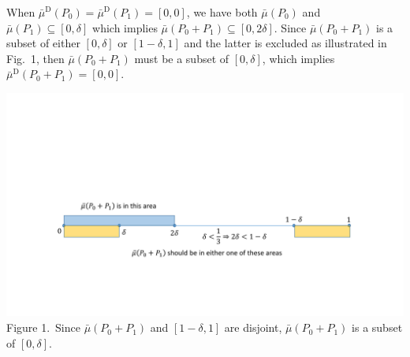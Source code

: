 \documentclass[english,reprint, aps, prl,superscriptaddress, showpacs,
showkeys, longbibliography, amsmath, amssymb, floatfix]{revtex4-1}
\theoremstyle{plain}
\theoremstyle{definition}
\newcommand{\imposs}{\ensuremath{\left[0,0\right]}}
\begin{document}
When $\bar{\mu}^{\textrm{D}}\left(P_{0}\right)=\bar{\mu}^{\textrm{D}}\left(P_{1}\right)=\imposs$,
we have both $\bar{\mu}\left(P_{0}\right)$ and $\bar{\mu}\left(P_{1}\right)\subseteq\left[0,\delta\right]$
which implies $\bar{\mu}\left(P_{0}+P_{1}\right)\subseteq\left[0,2\delta\right]$.
Since $\bar{\mu}\left(P_{0}+P_{1}\right)$ is a subset of either $\left[0,\delta\right]$
or $\left[1-\delta,1\right]$ and the latter is excluded as illustrated
in Fig.~1, then $\bar{\mu}\left(P_{0}+P_{1}\right)$ must be a subset
of $\left[0,\delta\right]$, which implies $\bar{\mu}^{\textrm{D}}\left(P_{0}+P_{1}\right)=\imposs$.
\begin{widetext}
\begin{center}
\includegraphics[bb=50bp 100bp 900bp 300bp,clip,scale=0.5]{prop_prop_letter_ajhs_referee_response_pptx}\\
Figure 1.~\label{fig:Show-subset}Since $\bar{\mu}\left(P_{0}+P_{1}\right)$
and $\left[1-\delta,1\right]$ are disjoint, $\bar{\mu}\left(P_{0}+P_{1}\right)$
is a subset of $\left[0,\delta\right]$.
\par\end{center}
\end{widetext}
\end{document}
